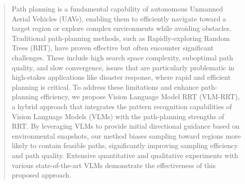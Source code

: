 \begin{abstract}
Path planning is a fundamental capability of autonomous Unmanned Aerial Vehicles (UAVs), enabling them to efficiently navigate toward a target region or explore complex environments while avoiding obstacles. Traditional path-planning methods, such as Rapidly-exploring Random Trees (RRT), have proven effective but often encounter significant challenges. These include high search space complexity, suboptimal path quality, and slow convergence, issues that are particularly problematic in high-stakes applications like disaster response, where rapid and efficient planning is critical. To address these limitations and enhance path-planning efficiency, we propose Vision Language Model RRT (VLM-RRT), a hybrid approach that integrates the pattern recognition capabilities of Vision Language Models (VLMs) with the path-planning strengths of RRT. By leveraging VLMs to provide initial directional guidance based on environmental snapshots, our method biases sampling toward regions more likely to contain feasible paths, significantly improving sampling efficiency and path quality. Extensive quantitative and qualitative experiments with various state-of-the-art VLMs demonstrate the effectiveness of this proposed approach.
\end{abstract}


